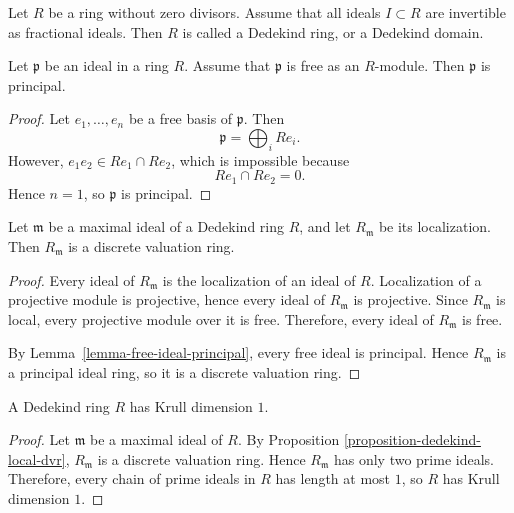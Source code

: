 \begin{definition}
\label{definition-dedekind-ring}
Let $R$ be a ring without zero
divisors.
Assume that all ideals $I\subset R$
are invertible as fractional ideals.
Then $R$ is called a Dedekind ring,
or a Dedekind domain.
\end{definition}

\begin{lemma}
\label{lemma-free-ideal-principal}
Let $\mathfrak{p}$ be an ideal in a
ring $R$.
Assume that $\mathfrak{p}$ is free as
an $R$-module.
Then $\mathfrak{p}$ is principal.
\end{lemma}

\begin{proof}
Let $e_1,\ldots,e_n$ be a free basis of
$\mathfrak{p}$.
Then
$$
\mathfrak{p}
=\bigoplus_i R e_i.
$$
However, $e_1e_2\in Re_1\cap Re_2$,
which is impossible because
$$
Re_1\cap Re_2=0.
$$
Hence $n=1$, so $\mathfrak{p}$ is
principal.
\end{proof}

\begin{proposition}
\label{proposition-dedekind-local-dvr}
Let $\mathfrak{m}$ be a maximal ideal of a
Dedekind ring $R$, and let $R_{\mathfrak{m}}$
be its localization.
Then $R_{\mathfrak{m}}$ is a discrete valuation
ring.
\end{proposition}

\begin{proof}
Every ideal of $R_{\mathfrak{m}}$ is the
localization of an ideal of $R$.
Localization of a projective module is
projective, hence every ideal of
$R_{\mathfrak{m}}$ is projective.
Since $R_{\mathfrak{m}}$ is local, every
projective module over it is free.
Therefore, every ideal of $R_{\mathfrak{m}}$
is free.

By Lemma~\ref{lemma-free-ideal-principal},
every free ideal is principal.
Hence $R_{\mathfrak{m}}$ is a principal ideal
ring, so it is a discrete valuation ring.
\end{proof}

\begin{corollary}
\label{lemma-dedekind-krull-dim-one}
A Dedekind ring $R$ has Krull dimension $1$.
\end{corollary}

\begin{proof}
Let $\mathfrak{m}$ be a maximal ideal of
$R$.
By Proposition
\ref{proposition-dedekind-local-dvr},
$R_{\mathfrak{m}}$ is a discrete valuation
ring.
Hence $R_{\mathfrak{m}}$ has only two prime
ideals.
Therefore, every chain of prime ideals in $R$
has length at most $1$, so $R$ has Krull
dimension $1$.
\end{proof}

